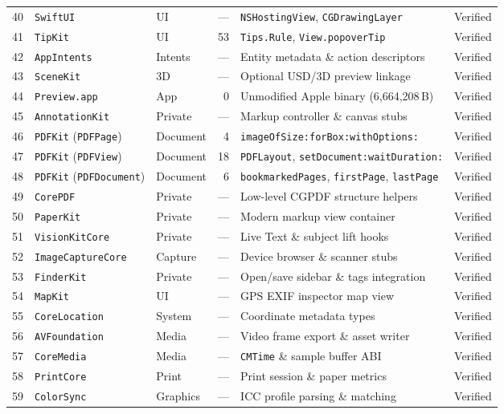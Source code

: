 \documentclass[10pt,twocolumn,letterpaper]{article}
\begin{document}
{\begin{longtable}{@{}r l l r l l@{}}
40 & \texttt{SwiftUI} & UI & --- & \texttt{NSHostingView}, \texttt{CGDrawingLayer} & Verified \\
41 & \texttt{TipKit} & UI & 53 & \texttt{Tips.Rule}, \texttt{View.popoverTip} & Verified \\
42 & \texttt{AppIntents} & Intents & --- & Entity metadata \& action descriptors & Verified \\
43 & \texttt{SceneKit} & 3D & --- & Optional USD/3D preview linkage & Verified \\
44 & \texttt{Preview.app} & App & 0 & Unmodified Apple binary (6,664,208\,B) & Verified \\
45 & \texttt{AnnotationKit} & Private & --- & Markup controller \& canvas stubs & Verified \\
46 & \texttt{PDFKit} (\texttt{PDFPage}) & Document & 4 & \texttt{imageOfSize:forBox:withOptions:} & Verified \\
47 & \texttt{PDFKit} (\texttt{PDFView}) & Document & 18 & \texttt{PDFLayout}, \texttt{setDocument:waitDuration:} & Verified \\
48 & \texttt{PDFKit} (\texttt{PDFDocument}) & Document & 6 & \texttt{bookmarkedPages}, \texttt{firstPage}, \texttt{lastPage} & Verified \\
49 & \texttt{CorePDF} & Private & --- & Low-level CGPDF structure helpers & Verified \\
50 & \texttt{PaperKit} & Private & --- & Modern markup view container & Verified \\
51 & \texttt{VisionKitCore} & Private & --- & Live Text \& subject lift hooks & Verified \\
52 & \texttt{ImageCaptureCore} & Capture & --- & Device browser \& scanner stubs & Verified \\
53 & \texttt{FinderKit} & Private & --- & Open/save sidebar \& tags integration & Verified \\
54 & \texttt{MapKit} & UI & --- & GPS EXIF inspector map view & Verified \\
55 & \texttt{CoreLocation} & System & --- & Coordinate metadata types & Verified \\
56 & \texttt{AVFoundation} & Media & --- & Video frame export \& asset writer & Verified \\
57 & \texttt{CoreMedia} & Media & --- & \texttt{CMTime} \& sample buffer ABI & Verified \\
58 & \texttt{PrintCore} & Print & --- & Print session \& paper metrics & Verified \\
59 & \texttt{ColorSync} & Graphics & --- & ICC profile parsing \& matching & Verified \\

\end{longtable}}
\end{document}
